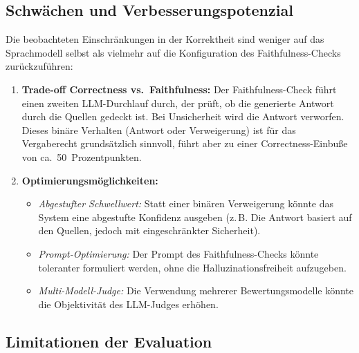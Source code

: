 \documentclass[12pt,a4paper]{scrreprt}
\begin{document}
\subsection{Schwächen und Verbesserungspotenzial}

Die beobachteten Einschränkungen in der Korrektheit sind weniger auf das Sprachmodell selbst als vielmehr auf die Konfiguration des Faithfulness-Checks zurückzuführen:

\begin{enumerate}
  \item \textbf{Trade-off Correctness vs.\ Faithfulness:} Der Faithfulness-Check führt einen zweiten LLM-Durchlauf durch, der prüft, ob die generierte Antwort durch die Quellen gedeckt ist. Bei Unsicherheit wird die Antwort verworfen. Dieses binäre Verhalten (Antwort oder Verweigerung) ist für das Vergaberecht grundsätzlich sinnvoll, führt aber zu einer Correctness-Einbuße von ca.\ 50~Prozentpunkten.
  \item \textbf{Optimierungsmöglichkeiten:}
  \begin{itemize}
    \item \textit{Abgestufter Schwellwert:} Statt einer binären Verweigerung könnte das System eine abgestufte Konfidenz ausgeben (z.\,B. \glqq Die Antwort basiert auf den Quellen, jedoch mit eingeschränkter Sicherheit\grqq{}).
    \item \textit{Prompt-Optimierung:} Der Prompt des Faithfulness-Checks könnte toleranter formuliert werden, ohne die Halluzinationsfreiheit aufzugeben.
    \item \textit{Multi-Modell-Judge:} Die Verwendung mehrerer Bewertungsmodelle könnte die Objektivität des LLM-Judges erhöhen.
  \end{itemize}
\end{enumerate}

\subsection{Limitationen der Evaluation}
\end{document}
